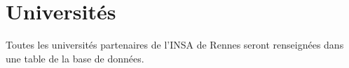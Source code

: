\chapter{Universités}
Toutes les universités partenaires de l'INSA de Rennes seront renseignées dans une table de la base de données. 